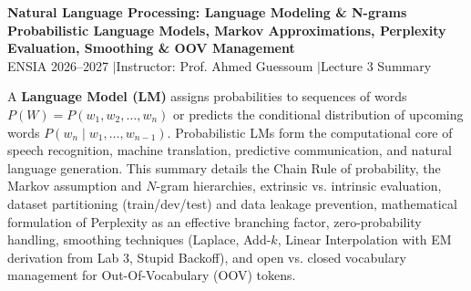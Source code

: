 \documentclass[10pt,a4paper]{article}
\begin{document}
\begin{center}
    \vspace{-4pt}
    {\LARGE\bfseries\color{themeblue} Natural Language Processing: Language Modeling \& N-grams}\\[1.5pt]
    {\normalsize\bfseries Probabilistic Language Models, Markov Approximations, Perplexity Evaluation, Smoothing \& OOV Management}\\[1.5pt]
    {\footnotesize\color{darkgray} ENSIA 2026--2027 \quad$\vert$\quad Instructor: Prof. Ahmed Guessoum \quad$\vert$\quad Lecture 3 Summary}
\end{center}

\vspace{-7pt}

\begin{overviewbox}
\footnotesize
A \textbf{Language Model (LM)} assigns probabilities to sequences of words $P(W) = P(w_1, w_2, \dots, w_n)$ or predicts the conditional distribution of upcoming words $P(w_n \mid w_1, \dots, w_{n-1})$. Probabilistic LMs form the computational core of speech recognition, machine translation, predictive communication, and natural language generation. This summary details the Chain Rule of probability, the Markov assumption and $N$-gram hierarchies, extrinsic vs. intrinsic evaluation, dataset partitioning (train/dev/test) and data leakage prevention, mathematical formulation of Perplexity as an effective branching factor, zero-probability handling, smoothing techniques (Laplace, Add-$k$, Linear Interpolation with EM derivation from Lab 3, Stupid Backoff), and open vs. closed vocabulary management for Out-Of-Vocabulary (OOV) tokens.
\end{overviewbox}

\vspace{-3pt}
\end{document}
